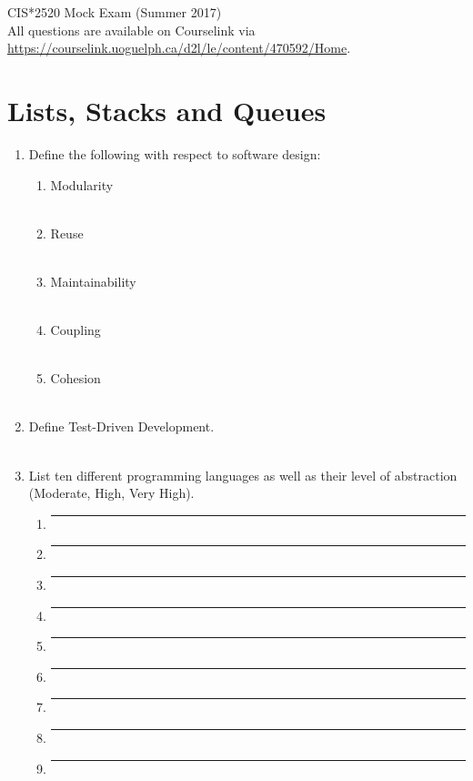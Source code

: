 \documentclass{article}
\begin{document}
\begin{center}
	{\Large CIS*2520 Mock Exam (Summer 2017)} \\
	\smallskip
	All questions are available on Courselink via \url{https://courselink.uoguelph.ca/d2l/le/content/470592/Home}.
\end{center}

\medskip
\section{Lists, Stacks and Queues}

\begin{enumerate}
	\item Define the following with respect to software design:
		\begin{enumerate}[label=\alph*.]
			\item Modularity \\\\
			\item Reuse \\\\
			\item Maintainability \\\\
			\item Coupling \\\\
			\item Cohesion \\\\
		\end{enumerate}
	\item Define Test-Driven Development. \\\\
	\item List ten different programming languages as well as their level of abstraction (Moderate, High, Very High).
		\begin{enumerate}[label=\arabic*.]
			\item \rule{8cm}{0.1mm}
			\item \rule{8cm}{0.1mm}
			\item \rule{8cm}{0.1mm}
			\item \rule{8cm}{0.1mm}
			\item \rule{8cm}{0.1mm}
			\item \rule{8cm}{0.1mm}
			\item \rule{8cm}{0.1mm}
			\item \rule{8cm}{0.1mm}
			\item \rule{8cm}{0.1mm}

\end{enumerate}
\end{enumerate}
\end{document}
